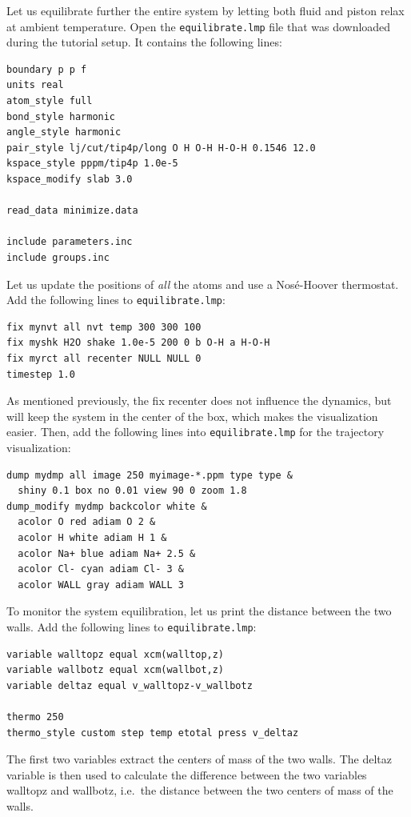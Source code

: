 \documentclass[9pt,tutorial]{livecoms}
\newcommand{\lmpcmd}[1]{\hspace{0pt}\colorbox{listing}{\textcolor{command}{\small{#1}}}\hspace{0pt}} %
\newcommand{\flecmd}[1]{\textcolor{command}{\texttt{#1}}} %
\begin{document}
Let us equilibrate further the entire system by letting both fluid and piston
relax at ambient temperature.  Open the \flecmd{equilibrate.lmp} file that was
downloaded during the tutorial setup.  It contains the following lines:
\begin{lstlisting}
boundary p p f
units real
atom_style full
bond_style harmonic
angle_style harmonic
pair_style lj/cut/tip4p/long O H O-H H-O-H 0.1546 12.0
kspace_style pppm/tip4p 1.0e-5
kspace_modify slab 3.0

read_data minimize.data

include parameters.inc
include groups.inc
\end{lstlisting}

Let us update the positions of \emph{all} the atoms and use a Nosé-Hoover
thermostat.  Add the following lines to \flecmd{equilibrate.lmp}:
\begin{lstlisting}
fix mynvt all nvt temp 300 300 100
fix myshk H2O shake 1.0e-5 200 0 b O-H a H-O-H
fix myrct all recenter NULL NULL 0
timestep 1.0
\end{lstlisting}
As mentioned previously, the \lmpcmd{fix recenter} does not influence the dynamics,
but will keep the system in the center of the box, which makes the
visualization easier.  Then, add the following lines into \flecmd{equilibrate.lmp}
for the trajectory visualization:
\begin{lstlisting}
dump mydmp all image 250 myimage-*.ppm type type &
  shiny 0.1 box no 0.01 view 90 0 zoom 1.8
dump_modify mydmp backcolor white &
  acolor O red adiam O 2 &
  acolor H white adiam H 1 &
  acolor Na+ blue adiam Na+ 2.5 &
  acolor Cl- cyan adiam Cl- 3 &
  acolor WALL gray adiam WALL 3
\end{lstlisting}

To monitor the system equilibration, let us print the distance between
the two walls. Add the following lines to \flecmd{equilibrate.lmp}:
\begin{lstlisting}
variable walltopz equal xcm(walltop,z)
variable wallbotz equal xcm(wallbot,z)
variable deltaz equal v_walltopz-v_wallbotz

thermo 250
thermo_style custom step temp etotal press v_deltaz
\end{lstlisting}
The first two variables extract the centers of mass of the two walls.  The
\lmpcmd{deltaz} variable is then used to calculate the difference between the two
variables \lmpcmd{walltopz} and \lmpcmd{wallbotz}, i.e.~the distance between the
two centers of mass of the walls.
\end{document}
